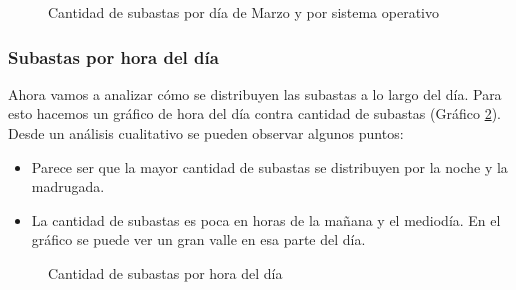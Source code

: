 \documentclass[a4paper, 12pt]{article}
\newcommand\tab[1][1cm]{\hspace*{#1}}
\begin{document}
	\FloatBarrier	
	\begin{figure}
			\centering
		   	\caption{Cantidad de subastas por día de Marzo y por sistema operativo}
		   	\label{subastasmarzoSO}
		\end{figure}
	\FloatBarrier
			
	\subsubsection{Subastas por hora del día}
	\tab Ahora vamos a analizar cómo se distribuyen las subastas a lo largo del día. Para esto hacemos un gráfico de hora del día contra cantidad de subastas (Gráfico \ref{subastashora}).\newline
	\tab Desde un análisis cualitativo se pueden observar algunos puntos:
	\begin{itemize}
		\item Parece ser que la mayor cantidad de subastas se distribuyen por la noche y la madrugada.
		\item La cantidad de subastas es poca en horas de la mañana y el mediodía. En el gráfico se puede ver un gran valle en esa parte del día.
	\end{itemize}
	
	\FloatBarrier
		\begin{figure}
			\centering
		   	\caption{Cantidad de subastas por hora del día}
			\label{subastashora}
		\end{figure}
	\FloatBarrier
\end{document}
